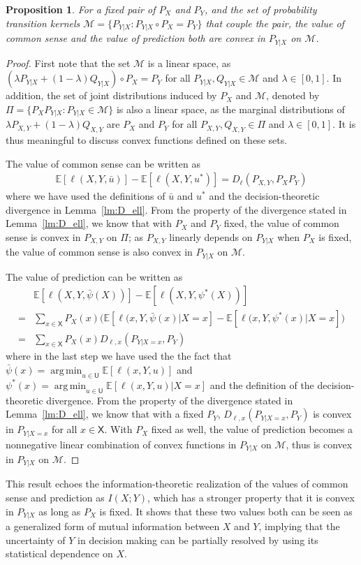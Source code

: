 \documentclass{article}
\newtheorem{proposition}{Proposition}
\newcommand{\E}{\mathbb{E}}
\DeclareMathOperator*{\argmin}{arg\,min}
\def\sU{{\mathsf U}}
\def\sX{{\mathsf X}}
\begin{document}
\begin{proposition}\label{prop:vo_coms_pred}
For a fixed pair of $P_X$ and $P_Y$, and the set of probability transition kernels $\mathcal{M}=\{P_{Y|X}:P_{Y|X}\circ P_X = P_Y\}$ that couple the pair, the value of common sense and the value of prediction both are convex in $P_{Y|X}$ on $\mathcal{M}$.
\end{proposition}
\begin{proof}
First note that the set $\mathcal{M}$ is a linear space, as $(\lambda P_{Y|X} + (1-\lambda)Q_{Y|X})\circ P_{X} = P_Y$ for all $P_{Y|X}, Q_{Y|X}\in \mathcal{M}$ and $\lambda\in[0,1]$.
In addition, the set of joint distributions induced by $P_X$ and $\mathcal{M}$, denoted by $\Pi = \{P_X P_{Y|X}: P_{Y|X}\in\mathcal{M}\}$ is also a linear space, as the marginal distributions of $\lambda P_{X,Y} + (1-\lambda)Q_{X,Y}$ are $P_X$ and $P_Y$ for all $P_{X,Y}, Q_{X,Y}\in {\Pi}$ and $\lambda\in[0,1]$.
It is thus meaningful to discuss convex functions defined on these sets.

The value of common sense can be written as
\begin{align}
\E[\ell(X,Y,\bar u)] - \E[\ell(X,Y,u^*)]  
=   D_{\ell}(P_{X,Y}, P_X P_Y) 
\end{align}
where we have used the definitions of $\bar u$ and $u^*$ and the decision-theoretic divergence in Lemma~\ref{lm:D_ell}.
From the property of the divergence stated in Lemma~\ref{lm:D_ell}, we know that with $P_X$ and $P_Y$ fixed, the value of common sense is convex in $P_{X,Y}$ on $\Pi$; as $P_{X,Y}$ linearly depends on $P_{Y|X}$ when $P_X$ is fixed, the value of common sense is also convex in $P_{Y|X}$ on $\mathcal M$.

The value of prediction can be written as
\begin{align}
& \E[\ell(X,Y,\bar\psi(X))] - \E[\ell(X,Y,\psi^*(X))]  \nonumber \\
= & \sum_{x\in\sX} P_X(x)  \big( \E[\ell(x,Y,\bar\psi(x)|X=x] - \E[\ell(x,Y,\psi^*(x)|X=x] \big) \\
= & \sum_{x\in\sX} P_X(x)  D_{\ell,x}(P_{Y|X=x}, P_Y) 
\end{align}
where in the last step we have used the the fact that $\bar \psi(x) = \argmin_{u\in\sU}  \E[\ell(x,Y,u)]$ and $\psi^*(x) = \argmin_{u\in\sU}  \E[\ell(x,Y,u)|X=x]$ and the definition of the decision-theoretic divergence.
From the property of the divergence stated in Lemma~\ref{lm:D_ell}, we know that with a fixed $P_Y$, $D_{\ell,x}(P_{Y|X=x}, P_Y)$ is convex in $P_{Y|X=x}$ for all $x\in\sX$.
With $P_X$ fixed as well, the value of prediction becomes a nonnegative linear combination of convex functions in $P_{Y|X}$ on $\mathcal{M}$, thus is convex in $P_{Y|X}$ on $\mathcal{M}$.
\end{proof}
This result echoes the information-theoretic realization of the values of common sense and prediction as $I(X;Y)$, which has a stronger property that it is convex in $P_{Y|X}$ as long as $P_X$ is fixed.
It shows that these two values both can be seen as a generalized form of mutual information between $X$ and $Y$, implying that the uncertainty of $Y$ in decision making can be partially resolved by using its statistical dependence on $X$.
\end{document}
